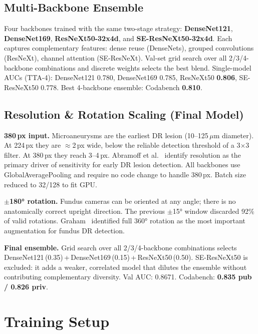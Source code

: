 \documentclass[a4paper, 10pt, twocolumn]{article}
\begin{document}
\subsection{Multi-Backbone Ensemble}

Four backbones trained with the same two-stage strategy:
\textbf{DenseNet121}, \textbf{DenseNet169}, \textbf{ResNeXt50-32x4d},
and \textbf{SE-ResNeXt50-32x4d}.
Each captures complementary features: dense reuse (DenseNets),
grouped convolutions (ResNeXt), channel attention (SE-ResNeXt).
Val-set grid search over all 2/3/4-backbone combinations and discrete
weights selects the best blend. Single-model AUCs (TTA-4):
DenseNet121 0.780, DenseNet169 0.785, ResNeXt50 \textbf{0.806},
SE-ResNeXt50 0.778.
Best 4-backbone ensemble: Codabench \textbf{0.810}.

\subsection{Resolution \& Rotation Scaling (Final Model)}

\textbf{380\,px input.} Microaneurysms are the earliest DR lesion
(10--125\,$\mu$m diameter). At 224\,px they are $\approx$2\,px wide,
below the reliable detection threshold of a 3$\times$3 filter. At
380\,px they reach 3--4\,px. Abramoff et al.~\cite{abramoff2018pivotal}
identify resolution as the primary driver of sensitivity for early DR
lesion detection. All backbones use GlobalAveragePooling and require
no code change to handle 380\,px. Batch size reduced to 32/128 to fit GPU.

\textbf{$\pm$180° rotation.} Fundus cameras can be oriented at any angle;
there is no anatomically correct upright direction. The previous $\pm$15°
window discarded 92\% of valid rotations. Graham~\cite{graham2015kaggle}
identified full 360° rotation as the most important augmentation for
fundus DR detection.

\textbf{Final ensemble.} Grid search over all 2/3/4-backbone combinations
selects DenseNet121\,(0.35)\,+\,DenseNet169\,(0.15)\,+\,ResNeXt50\,(0.50).
SE-ResNeXt50 is excluded: it adds a weaker, correlated model that dilutes
the ensemble without contributing complementary diversity.
Val AUC: 0.8671. Codabench: \textbf{0.835 pub / 0.826 priv}.

\section{Training Setup}
\end{document}
